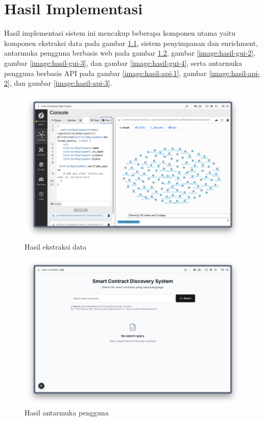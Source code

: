 \chapter{Hasil Implementasi}
\label{appendix:hasil-implementasi}

Hasil implementasi sistem ini mencakup beberapa komponen utama yaitu komponen ekstraksi data pada gambar \ref{image:hasil-data-1}, sistem penyimpanan dan enrichment, antarmuka pengguna berbasis web pada gambar \ref{image:hasil-gui-1}, gambar \ref{image:hasil-gui-2}, gambar \ref{image:hasil-gui-3}, dan gambar \ref{image:hasil-gui-4}, serta antarmuka pengguna berbasis API pada gambar \ref{image:hasil-api-1}, gambar \ref{image:hasil-api-2}, dan gambar \ref{image:hasil-api-3}.

\begin{figure}[ht]
	\centering
	\includegraphics[width=1\textwidth]{resources/appendix/hasil-data-1.png}
	\caption{Hasil ekstraksi data}
	\label{image:hasil-data-1}
\end{figure}

\begin{figure}[ht]
	\centering
	\includegraphics[width=1\textwidth]{resources/appendix/hasil-gui-1.png}
	\caption{Hasil antarmuka pengguna}
	\label{image:hasil-gui-1}
\end{figure}

